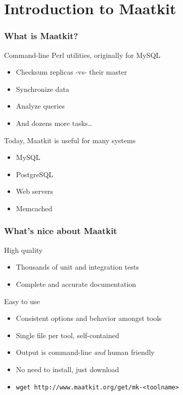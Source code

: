\section{Introduction to Maatkit}
\begin{frame}
   \frametitle{What is Maatkit?}
   \begin{block}{Command-line Perl utilities, originally for MySQL}
      \begin{itemize}
         \item Checksum replicas -vs- their master
         \item Synchronize data
         \item Analyze queries
         \item And dozens more tasks\dots
      \end{itemize}
   \end{block}
   \begin{block}{Today, Maatkit is useful for many systems}
      \begin{itemize}
         \item MySQL
         \item PostgreSQL
         \item Web servers
         \item Memcached
      \end{itemize}
   \end{block}
\end{frame}
\begin{frame}
   \frametitle{What's nice about Maatkit}
   \begin{block}{High quality}
      \begin{itemize}
         \item Thousands of unit and integration tests
         \item Complete and accurate documentation
      \end{itemize}
   \end{block}
   \begin{block}{Easy to use}
      \begin{itemize}
         \item Consistent options and behavior amongst tools
         \item Single file per tool, self-contained
         \item Output is command-line \emph{and} human friendly
         \item No need to install, just download
         \item \texttt{wget http://www.maatkit.org/get/mk-<toolname>}
      \end{itemize}
   \end{block}
\end{frame}

